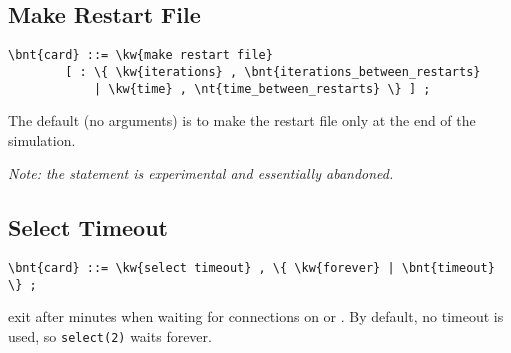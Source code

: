 \subsection{Make Restart File}
\begin{Verbatim}[commandchars=\\\{\}]
    \bnt{card} ::= \kw{make restart file}
        [ : \{ \kw{iterations} , \bnt{iterations_between_restarts}
            | \kw{time} , \nt{time_between_restarts} \} ] ;
\end{Verbatim}
The default (no arguments) is to make the restart file only at the end of
the simulation.

\emph{Note: the  statement is experimental and essentially abandoned.}

\subsection{Select Timeout}
\begin{Verbatim}[commandchars=\\\{\}]
    \bnt{card} ::= \kw{select timeout} , \{ \kw{forever} | \bnt{timeout} \} ;
\end{Verbatim}
exit after  minutes when waiting for connections 
on  or .
By default, no timeout is used, so \texttt{select(2)} waits forever.

